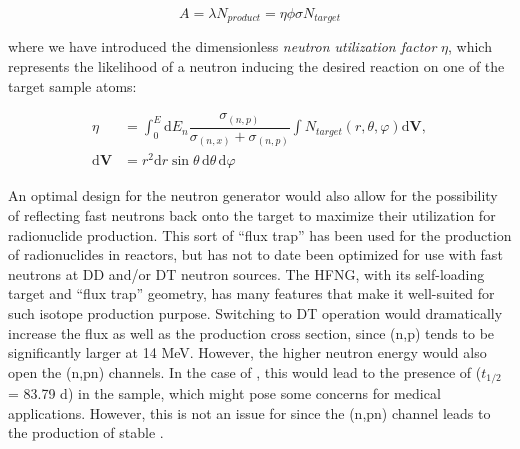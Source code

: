 \documentclass[5p]{elsarticle}
\newcommand{\pp}[1]{\left( #1\right)}
\newcommand{\comment}[1]{\todo[color=blue!20!white,inline]{ASV: #1}}
\begin{document}
\begin{equation}
A = \lambda N_{product} = \eta \phi \sigma N_{target}
\end{equation}

where we have introduced the dimensionless \emph{neutron utilization factor} $\eta$, which represents the likelihood of a neutron inducing the desired reaction on one of the target sample atoms:





\begin{align}
\eta &= \int_0^E \text{d}E_n \dfrac{\sigma_{(n,p)}}{\sigma_{(n,x)} + \sigma_{(n,p)}} \int N_{target} \pp{r,\theta,\varphi} \text{d}\mathbf{V}, \nonumber\\
\text{d}\mathbf{V} &= r^2 \text{d}r \sin{\theta}\, \text{d}\theta\, \text{d}\varphi 
\end{align}


An optimal design for the neutron generator would also allow for the possibility of reflecting fast neutrons back onto the target to maximize their utilization for radionuclide production.  This sort of \enquote{flux trap} has been used for the production of radionuclides in reactors, but has not to date been optimized for use with fast neutrons  at DD and/or DT neutron sources.  The HFNG, with its self-loading target and \enquote{flux trap} geometry, has many features that make it well-suited for such isotope production purpose.  Switching to DT operation would dramatically increase the flux as well as the production cross section, since (n,p) tends to be significantly larger at 14 MeV.  However, the higher neutron energy would also open the (n,pn) channels.  In the case of , this would lead to the presence of  ($t_{1/2}$ = 83.79 d) in the sample, which might pose some concerns for medical applications.  However, this is not an issue for  since the (n,pn) channel leads to the production of stable .  

\comment{cite relevant NDS article}
\end{document}
